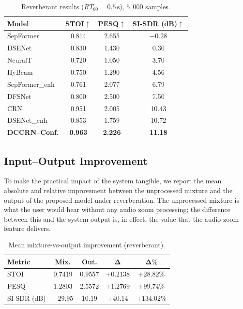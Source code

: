 \documentclass[journal,10pt]{IEEEtran}
\begin{document}
\begin{table}[!t]
\caption{Reverberant results (\(RT_{60}=0.5\,\mathrm{s}\)), \(5{,}000\) samples.}
\label{tab:reverb}
\centering
\begin{tabular}{l c c c}
\toprule
\textbf{Model} & \textbf{STOI}\(\uparrow\) & \textbf{PESQ}\(\uparrow\) & \textbf{SI-SDR (dB)}\(\uparrow\)\\
\midrule
SepFormer & 0.814 & 2.655 & \(-0.28\)\\
DSENet & 0.830 & 1.430 & 0.30\\
NeuralT & 0.720 & 1.050 & 3.70\\
HyBeam & 0.750 & 1.290 & 4.56\\
SepFormer\_enh & 0.761 & 2.077 & 6.79\\
DFSNet & 0.800 & 2.500 & 7.50\\
CRN & 0.951 & 2.005 & 10.43\\
DSENet\_enh & 0.853 & 1.759 & 10.72\\
\textbf{DCCRN--Conf.} & \textbf{0.963} & \textbf{2.226} & \textbf{11.18}\\
\bottomrule
\end{tabular}
\end{table}

\subsection{Input--Output Improvement}
To make the practical impact of the system tangible, we report the mean absolute and relative improvement between the unprocessed mixture and the output of the proposed model under reverberation. The unprocessed mixture is what the user would hear without any audio zoom processing; the difference between this and the system output is, in effect, the value that the audio zoom feature delivers.

\begin{table}[!t]
\caption{Mean mixture-vs-output improvement (reverberant).}
\label{tab:delta}
\centering
\begin{tabular}{l c c c c}
\toprule
\textbf{Metric} & \textbf{Mix.} & \textbf{Out.} & \(\boldsymbol{\Delta}\) & \(\boldsymbol{\Delta\%}\)\\
\midrule
STOI & 0.7419 & 0.9557 & \(+0.2138\) & \(+28.82\%\)\\
PESQ & 1.2803 & 2.5572 & \(+1.2769\) & \(+99.74\%\)\\
SI-SDR (dB) & \(-29.95\) & \(10.19\) & \(+40.14\) & \(+134.02\%\)\\
\bottomrule
\end{tabular}
\end{table}
\end{document}
